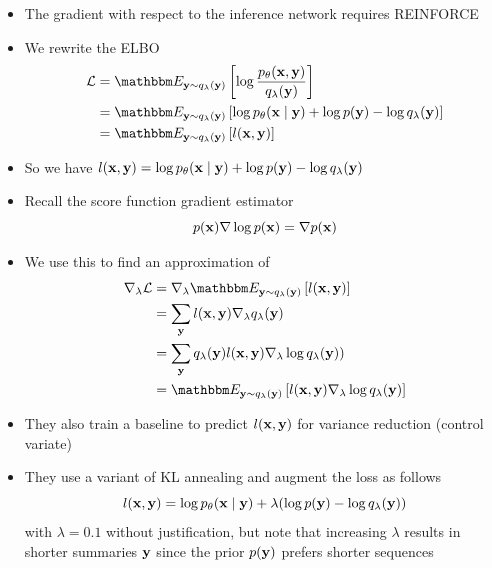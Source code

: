 \begin{frame}
\begin{center}
\end{center}
\begin{itemize}
\item The gradient with respect to the inference network requires REINFORCE
\item We rewrite the ELBO
\begin{align}
\mathcal{L} &= \E{\by\sim q_\lambda(\by)}{\log \frac{p_\theta(\bx,\by)}{q_\lambda(\by)}}\\
&= \E{\by\sim q_\lambda(\by)}{\log p_\theta(\bx\mid\by) + \log p(\by) - \log q_\lambda(\by)}\\
&= \E{\by\sim q_\lambda(\by)}{l(\bx,\by)}
\end{align}
\item So we have $l(\mathbf{x}, \mathbf{y}) = \log p_\theta(\mathbf{x}\mid\mathbf{y}) + \log p(\mathbf{y}) - \log q_\lambda(\mathbf{y})$
\end{itemize}
\end{frame}

\begin{frame}
\begin{center}
\end{center}
\begin{itemize}
\item Recall the score function gradient estimator
\begin{equation}
p(\mathbf{x})\nabla \log p(\mathbf{x}) = \nabla p(\mathbf{x})
\end{equation}
\item We use this to find an approximation of 
\begin{align}
\nabla_\lambda \mathcal{L} &= \nabla_\lambda\E{\by\sim q_\lambda(\by)}{l(\bx,\by)}\\
&= \sum_\by l(\bx,\by)\nabla_\lambda q_\lambda(\by)\\
&= \sum_\by q_\lambda(\by)l(\bx,\by)\nabla_\lambda\log q_\lambda(\by) )\\
&= \E{\by\sim q_\lambda(\by)}{l(\bx,\by) \nabla_\lambda\log q_\lambda(\by)}
\end{align}
\end{itemize}
\end{frame}

\begin{frame}
\begin{center}
\end{center}
\begin{itemize}
\item They also train a baseline to predict $l(\mathbf{x},\mathbf{y})$ for variance reduction (control variate)
\item They use a variant of KL annealing and augment the loss as follows
$$l(\mathbf{x}, \mathbf{y}) = \log p_\theta(\mathbf{x}\mid\mathbf{y}) + \lambda(\log p(\mathbf{y}) - \log q_\lambda(\mathbf{y}))$$
with $\lambda = 0.1$ without justification, but note that increasing $\lambda$ results
in shorter summaries $\mathbf{y}$ since the prior $p(\mathbf{y})$ prefers shorter sequences
\end{itemize}
\end{frame}



